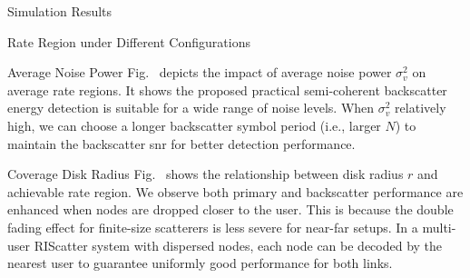\documentclass[journal]{IEEEtran}
\begin{document}
\begin{section}{Simulation Results}
\begin{subsection}{Rate Region under Different Configurations}
		\begin{subsubsection}{Average Noise Power}
			Fig.~ depicts the impact of average noise power $\sigma_v^2$ on average rate regions.
			It shows the proposed practical semi-coherent backscatter energy detection is suitable for a wide range of noise levels.
			When $\sigma_v^2$ relatively high, we can choose a longer backscatter symbol period (i.e., larger $N$) to maintain the backscatter \gls{snr} for better detection performance.
		\end{subsubsection}

		\begin{subsubsection}{Coverage Disk Radius}
			Fig.~ shows the relationship between disk radius $r$ and achievable rate region.
			We observe both primary and backscatter performance are enhanced when nodes are dropped closer to the user.
			This is because the double fading effect for finite-size scatterers is less severe for near-far setups.
			In a multi-user RIScatter system with dispersed nodes, each node can be decoded by the nearest user to guarantee uniformly good performance for both links.
		\end{subsubsection}
	\end{subsection}
	\label{st:simulation_results}
\end{section}
\end{document}
